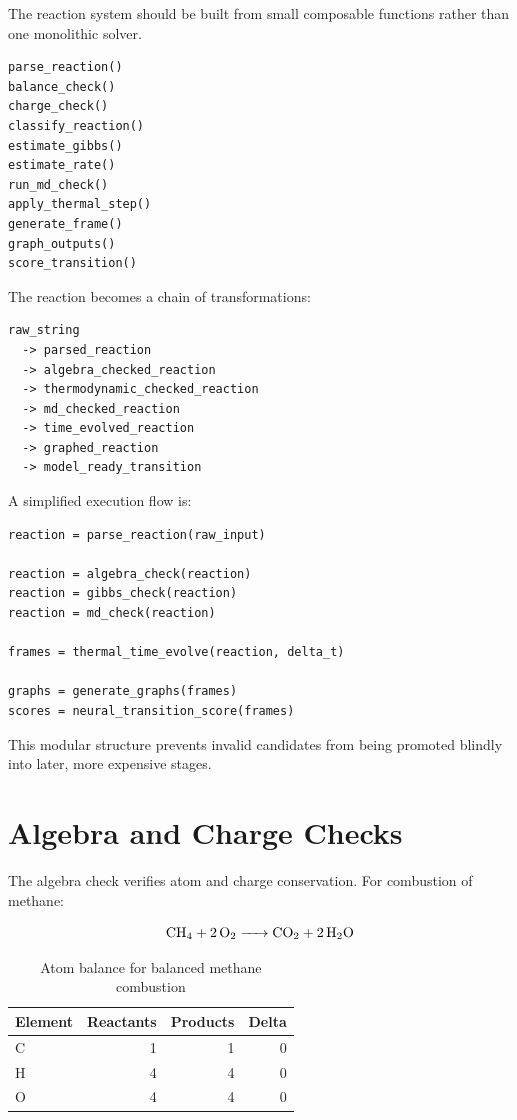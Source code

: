 \documentclass[11pt]{article}
\begin{document}
The reaction system should be built from small composable functions rather than one monolithic solver.

\begin{lstlisting}[caption={Composable pipeline functions}]
parse_reaction()
balance_check()
charge_check()
classify_reaction()
estimate_gibbs()
estimate_rate()
run_md_check()
apply_thermal_step()
generate_frame()
graph_outputs()
score_transition()
\end{lstlisting}

The reaction becomes a chain of transformations:

\begin{lstlisting}[caption={Functional transformation chain}]
raw_string
  -> parsed_reaction
  -> algebra_checked_reaction
  -> thermodynamic_checked_reaction
  -> md_checked_reaction
  -> time_evolved_reaction
  -> graphed_reaction
  -> model_ready_transition
\end{lstlisting}

A simplified execution flow is:

\begin{lstlisting}[caption={Simplified implementation sketch}]
reaction = parse_reaction(raw_input)

reaction = algebra_check(reaction)
reaction = gibbs_check(reaction)
reaction = md_check(reaction)

frames = thermal_time_evolve(reaction, delta_t)

graphs = generate_graphs(frames)
scores = neural_transition_score(frames)
\end{lstlisting}

This modular structure prevents invalid candidates from being promoted blindly into later, more expensive stages.

\section{Algebra and Charge Checks}

The algebra check verifies atom and charge conservation. For combustion of methane:

\[
\ce{CH4 + 2O2 -> CO2 + 2H2O}
\]

\begin{table}[H]
\centering
\caption{Atom balance for balanced methane combustion}
\begin{tabular}{lrrr}
\toprule
Element & Reactants & Products & Delta\\
\midrule
C & 1 & 1 & 0\\
H & 4 & 4 & 0\\
O & 4 & 4 & 0\\
\bottomrule
\end{tabular}
\end{table}
\end{document}
